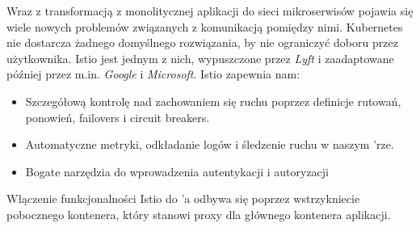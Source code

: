 Wraz z transformacją z monolitycznej aplikacji do sieci mikroserwisów pojawia się wiele nowych problemów związanych z komunikacją pomiędzy nimi.
Kubernetes nie dostarcza żadnego domyślnego rozwiązania, by nie ograniczyć doboru przez użytkownika.
Istio jest jednym z nich, wypuszczone przez \emph{Lyft} i zaadaptowane później przez m.in. \emph{Google} i \emph{Microsoft}. \cite{istio-what}
Istio zapewnia nam:

\begin{itemize}
    \item
    Szczegółową kontrolę nad zachowaniem się ruchu poprzez definicje rutowań, ponowień, failovers i circuit breakers.
    
    \item
    Automatyczne metryki, odkładanie logów i śledzenie ruchu w naszym 'rze.

    \item
    Bogate narzędzia do wprowadzenia autentykacji i autoryzacji
    
\end{itemize} 

Włączenie funkcjonalności Istio do 'a odbywa się poprzez wstrzykniecie pobocznego kontenera, 
który stanowi proxy dla głównego kontenera aplikacji.

